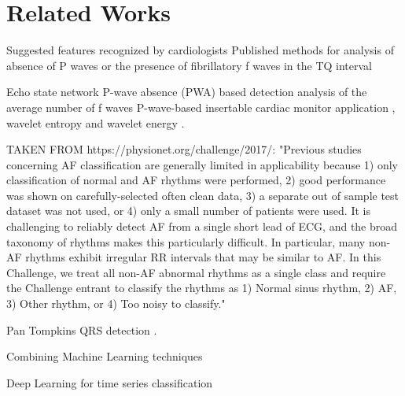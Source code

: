 \section{Related Works}


Suggested features recognized by cardiologists \cite{reiffel2010practice}
Published methods for analysis of absence of P waves or the presence of fibrillatory f waves in the TQ interval

Echo state network \cite{petrenas2012echo}
P-wave absence (PWA) based detection \cite{ladavich2015rate}
analysis of the average number of f waves \cite{du2014novel}
P-wave-based insertable cardiac monitor application \cite{purerfellner2014p},
wavelet entropy \cite{alcaraz2006wavelet, rodenas2015wavelet} and wavelet energy \cite{garcia2016application}.

TAKEN FROM https://physionet.org/challenge/2017/:
"Previous studies concerning AF classification are generally limited in applicability because 1) only classification of normal and AF rhythms were performed, 2) good performance was shown on carefully-selected often clean data, 3) a separate out of sample test dataset was not used, or 4) only a small number of patients were used. It is challenging to reliably detect AF from a single short lead of ECG, and the broad taxonomy of rhythms makes this particularly difficult. In particular, many non-AF rhythms exhibit irregular RR intervals that may be similar to AF. In this Challenge, we treat all non-AF abnormal rhythms as a single class and require the Challenge entrant to classify the rhythms as 1) Normal sinus rhythm, 2) AF, 3) Other rhythm, or 4) Too noisy to classify."

Pan Tompkins QRS detection \cite{waser2013removing}.

Combining Machine Learning techniques \cite{geurts2001pattern}

Deep Learning for time series classification \cite{langkvist2014review, wang2016time}
